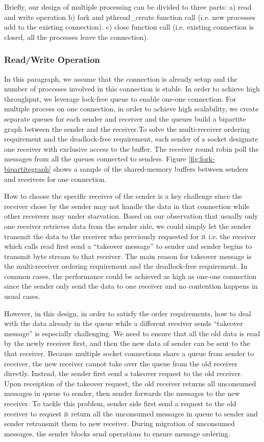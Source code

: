 Briefly, our design of multiple processing can be divided to three parts: a) read and write operation b) fork and pthread\_create function call (i.e. new processes add to the existing connection). c) close function call (i.e. existing connection is closed, all the processes leave the connection).


\subsubsection{Read/Write Operation}

In this paragraph, we assume that the connection is already setup and the number of processes involved in this connection is stable. In order to achieve high throughput, we leverage lock-free queue to enable one-one connection. For multiple process on one connection, in order to achieve high scalability, we create separate queues for each sender and receiver and the queues build a bipartite graph between the sender and the receiver.To solve the multi-receiver ordering requirement and the deadlock-free requirement, each sender of a socket designate one receiver with exclusive access to the buffer. The receiver round robin poll the messages from all the queues connected to senders. Figure \ref{fig:fork-bipartitegraph} shows a sample of the shared-memory buffers between senders and receivers for one connection. 

How to choose the specific receiver of the sender is a key challenge since the receiver chose by the sender may not handle the data in that connection while other receivers may under starvation. Based on our observation that usually only one receiver retrieves data from the sender side, we could simply let the sender transmit the data to the receiver who previously requested for it i.e. the receiver which calls read first send a ``takeover message'' to sender and sender begins to transmit byte stream to that receiver.  The main reason for takeover message is the multi-receiver ordering requirement and the deadlock-free requirement. In common cases, the performance could be achieved as high as one-one connection since the sender only send the data to one receiver and no contention happens in usual cases.

However, in this design, in order to satisfy the order requirements, how to deal with the data already in the queue while a different receiver sends ``takeover message'' is especially challenging.  We need to ensure that all the old data is read by the newly receiver first, and then the new data of sender can be sent to the that receiver. Because multiple socket connections share a queue from sender to receiver, the new receiver cannot take over the queue from the old receiver directly. Instead, the sender first send a takeover request to the old receiver. Upon receiption of the takeover request, the old receiver returns all unconsumed messages in queue to sender, then sender forwards the messages to the new receiver. To tackle this problem, sender side first send a request to the old receiver to request it return all the unconsumed messages in queue to sender and sender retransmit them to new receiver. During migration of unconsumed messages, the sender blocks send operations to ensure message ordering.

